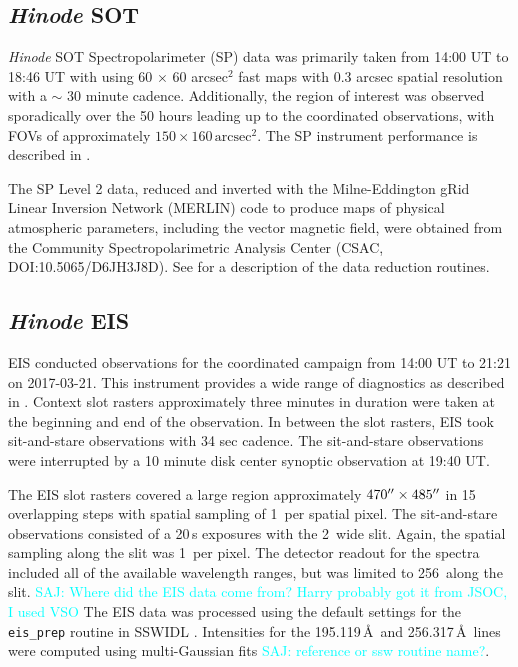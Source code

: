 \documentclass[twocolumn]{aastex62}
\newcommand{\unit}[1]{\ensuremath{\, \mathrm{#1}}}
\newcommand{\saj}[1]{\textcolor{cyan}{SAJ: #1}}
\begin{document}
\subsection{{\it Hinode} SOT}
{\it Hinode} SOT Spectropolarimeter (SP) data was primarily taken from 14:00 UT to 18:46 UT with using 60 $\times$ 60 arcsec$^2$ fast maps with 0.3 arcsec spatial resolution with a $\sim$ 30 minute cadence. Additionally, the region of interest was observed sporadically over the 50 hours leading up to the coordinated observations, with FOVs of approximately $150\times160\unit{arcsec}^2$.  %
The SP instrument performance is described in \citet{2013Litesetal}.

The SP Level 2 data, reduced and inverted with the Milne-Eddington gRid Linear Inversion Network (MERLIN) code to produce maps of physical atmospheric parameters, including the vector magnetic field, were obtained from the Community Spectropolarimetric Analysis Center (CSAC, DOI:10.5065/D6JH3J8D).  See \citet{2013Lites&Ichimoto} for a description of the data reduction routines.

\subsection{{\it Hinode} EIS}
EIS conducted observations for the coordinated campaign from 14:00 UT to 21:21 on 2017-03-21. This instrument provides a wide range of diagnostics as described in \citet{2007Young}. Context slot rasters approximately three minutes in duration were taken at the beginning and end of the observation.  In between the slot rasters, EIS took sit-and-stare observations with 34 sec cadence. The sit-and-stare observations were interrupted by a 10 minute disk center synoptic observation at 19:40 UT.

The EIS slot rasters covered a large region approximately $470\mbox{$^{\prime\prime}$}\times485\mbox{$^{\prime\prime}$}$ in 15 overlapping steps with spatial sampling of 1\arcsec\ per spatial pixel.  The sit-and-stare observations consisted of a 20\,s exposures with the 2\arcsec\ wide slit. Again, the spatial sampling along the slit was 1\arcsec\ per pixel. The detector readout for the spectra included all of the available wavelength ranges, but was limited to 256\arcsec\ along the slit. \saj{Where did the EIS data come from?  Harry probably got it from JSOC, I used VSO} The EIS data was processed using the default settings for the \verb+eis_prep+ routine in SSWIDL \citep{1998FreelandHandy_SSW}.  Intensities for the  195.119\,\AA\ and  256.317\,\AA\ lines were computed using multi-Gaussian fits \saj{reference or ssw routine name?}.
\end{document}
